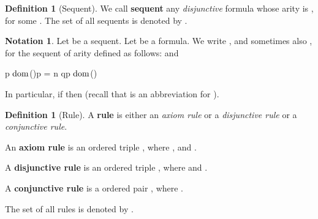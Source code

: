 \documentclass[copyright,creativecommons]{eptcs}
\newcommand{\vv}{\langle}
\newcommand{\ww}{\rangle}
\newcommand{\bS}{\mathbf{S}}
\newcommand{\bT}{\mathbf{T}}
\newcommand{\dom}{\ensuremath{\textnormal{dom}}}
\theoremstyle{definition}
\newtheorem{Definition}[theorem]{Definition}
\newtheorem{Notation}[theorem]{Notation}
\newcommand{\squishlist}{
 \begin{list}{}
  { \setlength{\itemsep}{0pt}
     \setlength{\parsep}{3pt}
     \setlength{\topsep}{3pt}
     \setlength{\partopsep}{0pt}
     \setlength{\leftmargin}{1em}
     \setlength{\labelwidth}{1.5em}
     \setlength{\labelsep}{0.5em} } }
\newcommand{\squishend}{
  \end{list}  }
\begin{document}
 \begin{Definition}[Sequent] \label{seq}
We call   \textbf{sequent}   any  \emph{disjunctive} formula  whose arity is , for some .
The set of all sequents is denoted by .
  \hfill 
\end{Definition}


\begin{Notation} \label{not}
 Let  be a sequent.  Let   be a formula. We write
,  and sometimes also ,
 for the sequent  of arity
  defined as follows:  and
\squishlist
\item[] {\centering


 p \in \dom(\bS)p = \vv n \ww \star qp  \in \dom(\bT)
 \par}
\squishend
 In particular, if   then   (recall that  is an abbreviation for ).\hfill 
\end{Notation}



 \begin{Definition}[Rule]
 A \textbf{rule}  is either an \emph{axiom
 rule} or a \emph{disjunctive rule} or a \emph{conjunctive rule}.
 \squishlist
 \item An \textbf{axiom rule} is an ordered triple , where   ,  and .
 \item
A \textbf{disjunctive rule} is an ordered triple  , where  and .
 \item A \textbf{conjunctive rule} is a ordered pair  , where .
  \squishend
  The set of all rules is denoted by .
    \hfill 
 \end{Definition}
\end{document}
